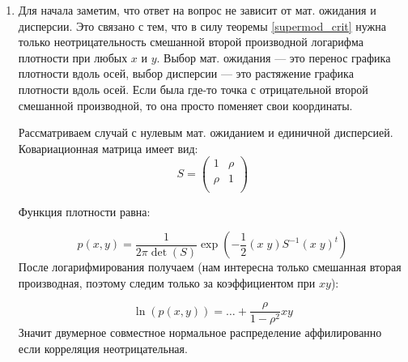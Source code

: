 \begin{enumerate}
\begin{enumerate}
\end{enumerate}

\item Для начала заметим, что ответ на вопрос не зависит от мат. ожидания и дисперсии. Это связано с тем, что в силу теоремы \ref{supermod_crit} нужна только неотрицательность смешанной второй производной логарифма плотности при любых $ x $ и $ y $. Выбор мат. ожидания — это перенос графика плотности вдоль осей, выбор дисперсии — это растяжение графика плотности вдоль осей. Если была где-то точка с отрицательной второй смешанной производной, то она просто поменяет свои координаты.

Рассматриваем случай с нулевым мат. ожиданием и единичной дисперсией. Ковариационная матрица имеет вид:
\begin{equation}
S=\left(\begin{array}{cc}
1 & \rho \\
\rho & 1 \\
\end{array}
\right)
\end{equation}

Функция плотности равна:

\begin{equation}
p(x,y)=\frac{1}{2\pi \det(S)} \exp\left(-\frac{1}{2}(x\; y)S^{-1}(x\; y)^{t}\right)
\end{equation}
После логарифмирования получаем (нам интересна только смешанная вторая производная, поэтому следим только за коэффициентом при $ xy $):

\begin{equation}
\ln (p(x,y))=\ldots+\frac{\rho}{1-\rho^{2}}xy
\end{equation}
Значит двумерное совместное нормальное распределение аффилированно если корреляция неотрицательная.


\end{enumerate}
